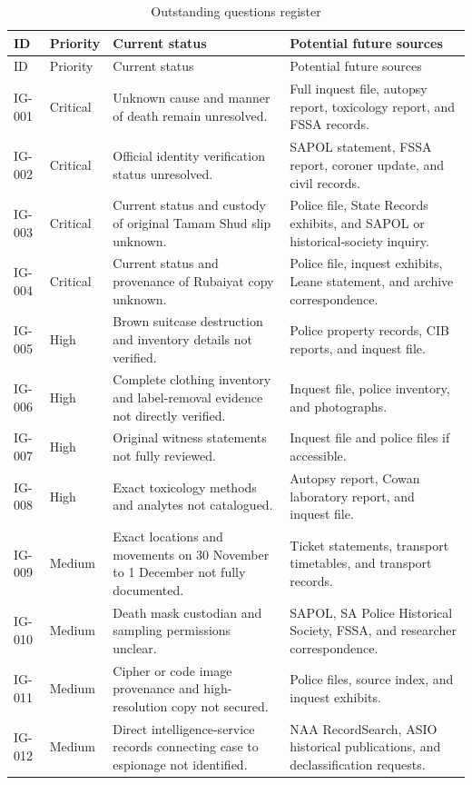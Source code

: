 \begingroup
\scriptsize
\setlength{\tabcolsep}{2pt}
\renewcommand{\arraystretch}{1.12}
\begin{longtable}{>{\raggedright\arraybackslash}p{}>{\raggedright\arraybackslash}p{}>{\raggedright\arraybackslash}p{}>{\raggedright\arraybackslash}p{}}
\caption{Outstanding questions register}\label{tab:chapter11-outstanding-questions}\\
\toprule
ID & Priority & Current status & Potential future sources \\
\midrule
\endfirsthead
\toprule
ID & Priority & Current status & Potential future sources \\
\midrule
\endhead
IG-001 & Critical & Unknown cause and manner of death remain unresolved. & Full inquest file, autopsy report, toxicology report, and FSSA records. \\
IG-002 & Critical & Official identity verification status unresolved. & SAPOL statement, FSSA report, coroner update, and civil records. \\
IG-003 & Critical & Current status and custody of original Tamam Shud slip unknown. & Police file, State Records exhibits, and SAPOL or historical-society inquiry. \\
IG-004 & Critical & Current status and provenance of Rubaiyat copy unknown. & Police file, inquest exhibits, Leane statement, and archive correspondence. \\
IG-005 & High & Brown suitcase destruction and inventory details not verified. & Police property records, CIB reports, and inquest file. \\
IG-006 & High & Complete clothing inventory and label-removal evidence not directly verified. & Inquest file, police inventory, and photographs. \\
IG-007 & High & Original witness statements not fully reviewed. & Inquest file and police files if accessible. \\
IG-008 & High & Exact toxicology methods and analytes not catalogued. & Autopsy report, Cowan laboratory report, and inquest file. \\
IG-009 & Medium & Exact locations and movements on 30 November to 1 December not fully documented. & Ticket statements, transport timetables, and transport records. \\
IG-010 & Medium & Death mask custodian and sampling permissions unclear. & SAPOL, SA Police Historical Society, FSSA, and researcher correspondence. \\
IG-011 & Medium & Cipher or code image provenance and high-resolution copy not secured. & Police files, source index, and inquest exhibits. \\
IG-012 & Medium & Direct intelligence-service records connecting case to espionage not identified. & NAA RecordSearch, ASIO historical publications, and declassification requests. \\
\bottomrule
\end{longtable}
\endgroup

